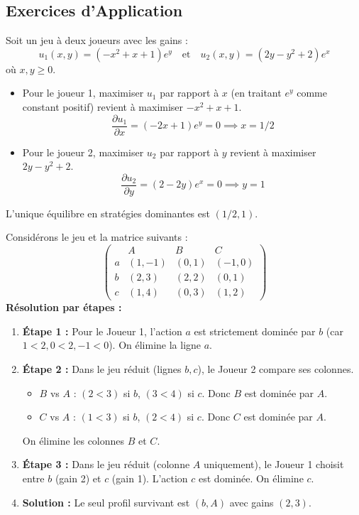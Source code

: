 \subsection{Exercices d'Application}

\begin{exemple}
Soit un jeu à deux joueurs avec les gains :
\[ u_1(x, y) = (-x^2 + x + 1)e^y \quad \text{et} \quad u_2(x, y) = (2y - y^2 + 2)e^x \]
où $x, y \ge 0$.
\begin{itemize}
    \item Pour le joueur 1, maximiser $u_1$ par rapport à $x$ (en traitant $e^y$ comme constant positif) revient à maximiser $-x^2 + x + 1$.
    \[ \frac{\partial u_1}{\partial x} = (-2x + 1)e^y = 0 \implies x = 1/2 \]
    \item Pour le joueur 2, maximiser $u_2$ par rapport à $y$ revient à maximiser $2y - y^2 + 2$.
    \[ \frac{\partial u_2}{\partial y} = (2 - 2y)e^x = 0 \implies y = 1 \]
\end{itemize}
L'unique équilibre en stratégies dominantes est $(1/2, 1)$.
\end{exemple}

\begin{exemple}
Considérons le jeu et la matrice suivants :
\[
\begin{pmatrix} & A & B & C \\ a & (1,-1) & (0,1) & (-1,0) \\ b & (2,3) & (2,2) & (0,1) \\ c & (1,4) & (0,3) & (1,2) \end{pmatrix}
\]
\textbf{Résolution par étapes :}
\begin{enumerate}
    \item \textbf{Étape 1 :} Pour le Joueur 1, l'action $a$ est strictement dominée par $b$ (car $1<2, 0<2, -1<0$). On élimine la ligne $a$.
    \item \textbf{Étape 2 :} Dans le jeu réduit (lignes $b, c$), le Joueur 2 compare ses colonnes.
    \begin{itemize}
        \item $B$ vs $A$ : $(2 < 3)$ si $b$, $(3 < 4)$ si $c$. Donc $B$ est dominée par $A$.
        \item $C$ vs $A$ : $(1 < 3)$ si $b$, $(2 < 4)$ si $c$. Donc $C$ est dominée par $A$.
    \end{itemize}
    On élimine les colonnes $B$ et $C$.
    \item \textbf{Étape 3 :} Dans le jeu réduit (colonne $A$ uniquement), le Joueur 1 choisit entre $b$ (gain 2) et $c$ (gain 1). L'action $c$ est dominée. On élimine $c$.
    \item \textbf{Solution :} Le seul profil survivant est $(b, A)$ avec gains $(2, 3)$.
\end{enumerate}
\end{exemple}

